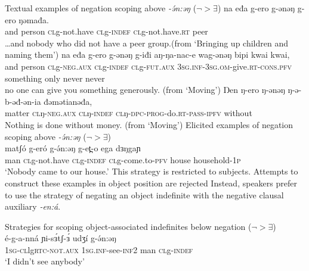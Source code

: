 \ea Textual examples of negation scoping above \textit{-ə́n:əŋ} ($\neg>\exists$) \label{neg1} %
\ea \gll na eđa g-ero g-ənəŋ g-ero ŋəmađa.\\
		and person \textsc{cl}g-not.have \textsc{cl}g-\textsc{indef} \textsc{cl}g-not.have.\textsc{rt} peer\\
	\glt \ldots and nobody who did not have a peer group.\hfill (from `Bringing up children and naming them')
	\ex \gll na eđa g-ero g-ǝnǝŋ g-iđi aŋ-ŋa-nac-e wag-ǝnǝŋ bipi kwai kwai,\\
and person \textsc{cl}g-\textsc{neg.aux} \textsc{cl}g-\textsc{indef} \textsc{cl}g-\textsc{fut.aux} 3\textsc{sg}.\textsc{inf}-3\textsc{sg.om}-give.\textsc{rt}-\textsc{cons}.\textsc{pfv} something only never never\\
	\glt  no one can give you something generously. \hfill (from `Moving')
	\ex \gll Ŋen ŋ-ero ŋ-ǝnǝŋ ŋ-ǝ-b-ǝđ-ǝn-ia đǝmǝtianǝđa,\\
matter \textsc{cl}ŋ-\textsc{neg.aux} \textsc{cl}ŋ-\textsc{indef} \textsc{cl}ŋ-\textsc{dpc}-\textsc{prog}-do.\textsc{rt}-\textsc{pass}-\textsc{ipfv} without\\
	\glt Nothing is done without money. \hfill (from `Moving')
		\z 
\z
	\ea Elicited examples of negation scoping above \textit{-ə́n:əŋ} ($\neg>\exists$) \label{neg2}\\
	\gll matʃó g-eró g-ə́n:əŋ g-et̪-o ega dɜŋgaɲ\\
man \textsc{cl}g-not.have \textsc{cl}g-\textsc{indef} \textsc{cl}g-come.to-\textsc{pfv} house household-\textsc{1p} \\ %
	\glt ‘Nobody came to our house.’
\z 
This strategy is restricted to subjects. Attempts to construct these examples in object position are rejected Instead, speakers prefer to use the strategy of negating an object indefinite with the negative clausal auxiliary \textit{-en:á}.

\ea Strategies for scoping object-associated indefinites below negation ($\neg>\exists$) \label{neg2}\\
	\ea  \gll é-g-a-nná ɲi-sɜ́tʃ-ɜ́  udʒí g-ə́n:əŋ\\
\textsc{1sg-cl}lg\textsc{rtc}-\textsc{not.aux} \textsc{1sg.inf}-see-\textsc{inf2}  man \textsc{cl}g-\textsc{indef}\\ %
  		\glt `I didn't see anybody'
\z 
\z

